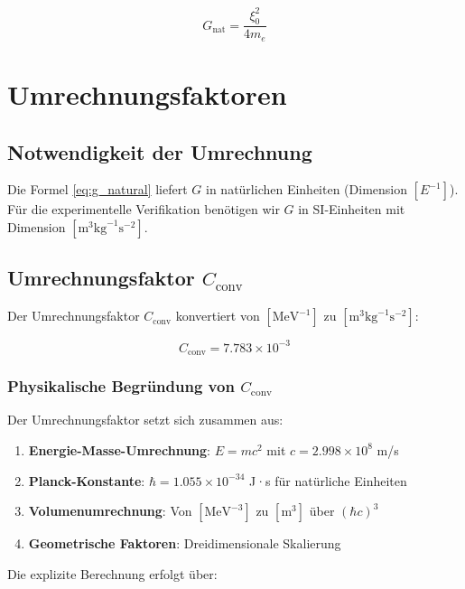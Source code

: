 \documentclass[12pt,a4paper]{article}
\newcommand{\Cconv}{C_{\text{conv}}}
\begin{document}
	\begin{equation}
		G_{\text{nat}} = \frac{\xi_0^2}{4 m_e}
		\label{eq:g_natural}
	\end{equation}
	
	\section{Umrechnungsfaktoren}
	
	\subsection{Notwendigkeit der Umrechnung}
	
	Die Formel \eqref{eq:g_natural} liefert $G$ in natürlichen Einheiten (Dimension $[E^{-1}]$). Für die experimentelle Verifikation benötigen wir $G$ in SI-Einheiten mit Dimension $[\text{m}^3 \text{kg}^{-1} \text{s}^{-2}]$.
	
	\subsection{Umrechnungsfaktor $\Cconv$}
	
	Der Umrechnungsfaktor $\Cconv$ konvertiert von $[\text{MeV}^{-1}]$ zu $[\text{m}^3 \text{kg}^{-1} \text{s}^{-2}]$:
	
	\begin{equation}
		\Cconv = 7.783 \times 10^{-3}
	\end{equation}
	
	\subsubsection{Physikalische Begründung von $\Cconv$}
	
	Der Umrechnungsfaktor setzt sich zusammen aus:
	
	\begin{enumerate}
		\item \textbf{Energie-Masse-Umrechnung}: $E = mc^2$ mit $c = 2.998 \times 10^8$ m/s
		\item \textbf{Planck-Konstante}: $\hbar = 1.055 \times 10^{-34}$ J·s für natürliche Einheiten
		\item \textbf{Volumenumrechnung}: Von $[\text{MeV}^{-3}]$ zu $[\text{m}^3]$ über $(\hbar c)^3$
		\item \textbf{Geometrische Faktoren}: Dreidimensionale Skalierung
	\end{enumerate}
	
	Die explizite Berechnung erfolgt über:
	
\end{document}
